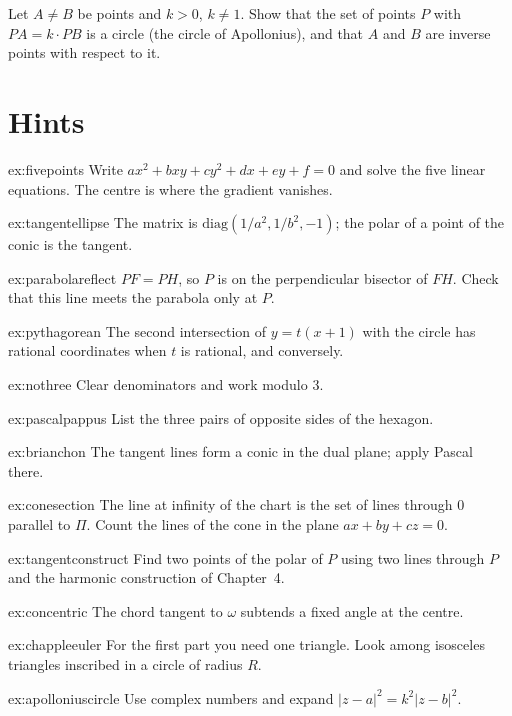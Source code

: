 \begin{exercise}[$\star$]\label{ex:apolloniuscircle}
Let $A\ne B$ be points and $k>0$, $k\ne1$. Show that the set of points $P$ with $PA=k\cdot PB$ is a circle (the circle of Apollonius), and that $A$ and
$B$ are inverse points with respect to it.
\end{exercise}

\section{Hints}

\begin{hint}{ex:fivepoints}
Write $ax^2+bxy+cy^2+dx+ey+f=0$ and solve the five linear equations. The centre is where the gradient vanishes.
\end{hint}
\begin{hint}{ex:tangentellipse}
The matrix is $\mathrm{diag}(1/a^2,1/b^2,-1)$; the polar of a point of the conic is the tangent.
\end{hint}
\begin{hint}{ex:parabolareflect}
$PF=PH$, so $P$ is on the perpendicular bisector of $FH$. Check that this line meets the parabola only at $P$.
\end{hint}
\begin{hint}{ex:pythagorean}
The second intersection of $y=t(x+1)$ with the circle has rational coordinates when $t$ is rational, and conversely.
\end{hint}
\begin{hint}{ex:nothree}
Clear denominators and work modulo $3$.
\end{hint}
\begin{hint}{ex:pascalpappus}
List the three pairs of opposite sides of the hexagon.
\end{hint}
\begin{hint}{ex:brianchon}
The tangent lines form a conic in the dual plane; apply Pascal there.
\end{hint}
\begin{hint}{ex:conesection}
The line at infinity of the chart is the set of lines through $0$ parallel to $\Pi$. Count the lines of the cone in the plane $ax+by+cz=0$.
\end{hint}
\begin{hint}{ex:tangentconstruct}
Find two points of the polar of $P$ using two lines through $P$ and the harmonic construction of Chapter~4.
\end{hint}
\begin{hint}{ex:concentric}
The chord tangent to $\omega$ subtends a fixed angle at the centre.
\end{hint}
\begin{hint}{ex:chappleeuler}
For the first part you need one triangle. Look among isosceles triangles inscribed in a circle of radius $R$.
\end{hint}
\begin{hint}{ex:apolloniuscircle}
Use complex numbers and expand $|z-a|^2=k^2|z-b|^2$.
\end{hint}

